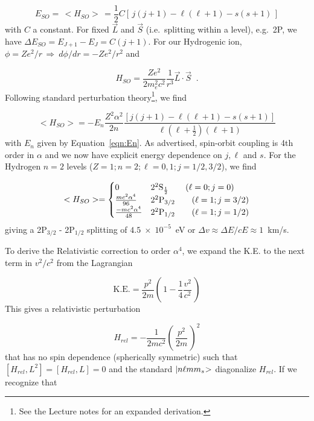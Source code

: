\documentclass[graybox]{svmult}
\def\ohf{\frac{1}{2}}
\def\ket#1{{|#1\negmedspace>}}
\def\ltk{\left [ \,}
\def\ltp{\left ( \,}
\def\rtk{\, \right  ] }
\def\rtp{\, \right  ) }
\def\imp{\, \Rightarrow \>}
\def\sci#1{{\; \times \; 10^{#1}}}
\begin{document}
\begin{equation}
E_{SO} = \, <H_{SO}> \, = \ohf C \ltk j(j+1) - \ell(\ell+1) - s(s+1) \rtk
\end{equation}
with $C$ a constant.
For fixed $\vec L$ and $\vec S$ (i.e.\ splitting within a level), 
e.g.\ 2P, we have $\Delta E_{SO} = E_{J+1} - E_J = C (j+1)$.
For our Hydrogenic ion,
$\phi = Z e^2/r \imp d \phi/dr = -Z e^2/r^2$ and

\begin{equation}
H_{SO} = \frac{Z e^2}{2 m_e^2 c^2} \frac{1}{r^3} \vec L \cdot \vec S  \;\; .
\end{equation}
Following standard perturbation 
theory\footnote{See the Lecture notes for an expanded derivation.},
we find

\begin{equation}
<H_{SO}> = -E_n \frac{Z^2 \alpha^2}{2n} \frac{[j(j+1) - 
\ell(\ell+1) - s(s+1)]}{\ell(\ell+\ohf)(\ell+1)}
\end{equation}
with $E_n$ given by Equation~\ref{eqn:En}.
As advertised, spin-orbit coupling is 4th order in $\alpha$
and we now have explicit energy dependence on $j,\ell$ and $s$.
For the Hydrogen $n=2$ levels ($Z=1; n=2; \ell = 0,1; j= 1/2, 3/2$),
we find

\begin{equation}
<H_{SO}> = 
  \begin{cases}
	0 &  2 ^2{\rm S}_\ohf \quad\quad (\ell = 0; j=0) \\
     \frac{mc^2 \alpha^4}{96} &  2 ^2{\rm P}_{3/2} \quad\quad (\ell=1; j=3/2) \\
     \frac{-mc^2 \alpha^4}{48} &  2 ^2{\rm P}_{1/2} \quad\quad (\ell=1; j=1/2) \\
  \end{cases}
\end{equation}
giving a 2P$_{3/2}$ - 2P$_{1/2}$ splitting of $4.5 \sci{-5}$~eV
or $\Delta v \approx \Delta E / cE \approx 1$~km/s.

To derive the Relativistic correction to order $\alpha^4$,
we expand the K.E. to the next term in $v^2/c^2$ from the Lagrangian

\begin{equation}
\text{K.E.} = \frac{p^2}{2m} \ltp 1 - \frac{1}{4} \frac{v^2}{c^2} \rtp
\end{equation}
This gives a relativistic perturbation 

\begin{equation}
H_{rel} = -\frac{1}{2mc^2} \ltp \frac{p^2}{2m} \rtp^2
\end{equation}
that has no spin dependence (spherically symmetric)
such that $[H_{rel}, L^2] = [H_{rel}, L] = 0$
and the standard $\ket{n \ell m m_s}$ diagonalize $H_{rel}$.
If we recognize that
\end{document}
